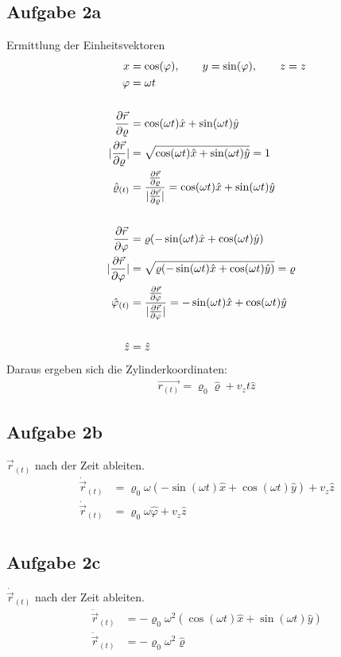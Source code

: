 \documentclass[a4paper,10pt]{extarticle}
\begin{document}
\subsection*{Aufgabe 2a}
Ermittlung der Einheitsvektoren
\begin{align*}
x &= \cos(\varphi), \qquad y = \sin(\varphi), \qquad z = z \\
\varphi &= \omega t \\ \\
\pdv{\vec{r}}{\varrho} &= \cos(\omega t ) \hat{x} + \sin(\omega t ) \hat{y} \\ 
| \pdv{\vec{r}}{\varrho} | &= \sqrt{\cos(\omega t ) \hat{x} + \sin(\omega t ) \hat{y}} = 1 \\ 
\hat{\varrho}_{(t)} &= \frac{\pdv{\vec{r}}{\varrho}}{ | \pdv{\vec{r}}{\varrho} | } = \cos(\omega t ) \hat{x} + \sin(\omega t ) \hat{y} \\ \\
\pdv{\vec{r}}{\varphi} &= \varrho (-\sin(\omega t ) \hat{x} + \cos(\omega t ) \hat{y}) \\ 
| \pdv{\vec{r}}{\varphi} | &= \sqrt{\varrho (-\sin(\omega t ) \hat{x} + \cos(\omega t ) \hat{y})} = \varrho \\ 
\hat{\varphi}_{(t)} &= \frac{\pdv{\vec{r}}{\varphi}}{ | \pdv{\vec{r}}{\varphi} | } = -\sin(\omega t ) \hat{x} + \cos(\omega t ) \hat{y} \\ \\
\hat{z} &= \hat{z}
\end{align*}
Daraus ergeben sich die Zylinderkoordinaten: 
\begin{align*}
\vec{r_{(t)}} = \varrho_0 \hat{\varrho} + v_z t \hat{z}
\end{align*}

\subsection*{Aufgabe 2b}
$\vec{r}_{(t)}$ nach der Zeit ableiten.
\begin{align*}
\dot{\vec{r}}_{(t)} &= \varrho_0 \omega (-\sin(\omega t )\hat{x} + \cos(\omega t ) \hat{y}) + v_z \hat{z} \\
\dot{\vec{r}}_{(t)} &= \varrho_0 \omega \hat{\varphi} + v_z \hat{z} \\
\end{align*}

\subsection*{Aufgabe 2c}
$\dot{\vec{r}}_{(t)}$ nach der Zeit ableiten.
\begin{align*}
\ddot{\vec{r}}_{(t)} &= - \varrho_0 \omega^2 (\cos(\omega t )\hat{x} + \sin(\omega t ) \hat{y}) \\
\ddot{\vec{r}}_{(t)} &= - \varrho_0 \omega^2 \hat{\varrho} \\
\end{align*}
\end{document}
